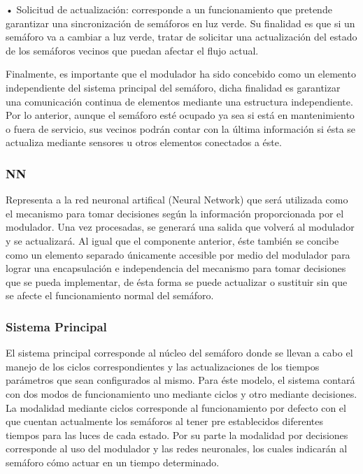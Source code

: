 •	Solicitud de actualizaci\'{o}n: corresponde a un funcionamiento que pretende garantizar una sincronizaci\'{o}n de sem\'{a}foros en luz verde. Su finalidad es que si un sem\'{a}foro va a cambiar a luz verde, tratar de solicitar una actualizaci\'{o}n del estado de los sem\'{a}foros vecinos que puedan afectar el flujo actual.

Finalmente, es importante que el modulador ha sido concebido como un elemento independiente del sistema principal del sem\'{a}foro, dicha finalidad es garantizar una comunicaci\'{o}n continua de elementos mediante una estructura independiente. Por lo anterior, aunque el sem\'{a}foro est\'{e} ocupado ya sea si est\'{a} en mantenimiento o fuera de servicio, sus vecinos podr\'{a}n contar con la \'{u}ltima informaci\'{o}n si \'{e}sta se actualiza mediante sensores u otros elementos conectados a \'{e}ste.


\subsubsection{NN}
Representa a la red neuronal artifical (Neural Network) que ser\'{a} utilizada como el mecanismo para tomar decisiones seg\'{u}n la informaci\'{o}n proporcionada por el modulador. Una vez procesadas, se generar\'{a} una salida que volver\'{a} al modulador y se actualizar\'{a}. Al igual que el componente anterior, \'{e}ste tambi\'{e}n se concibe como un elemento separado \'{u}nicamente accesible por medio del modulador para lograr una encapsulaci\'{o}n e independencia del mecanismo para tomar decisiones que se pueda implementar, de \'{e}sta forma se puede actualizar o sustituir sin que se afecte el funcionamiento normal del sem\'{a}foro.


\subsubsection{Sistema Principal}

El sistema principal corresponde al n\'{u}cleo del sem\'{a}foro donde se llevan a cabo el manejo de los ciclos correspondientes y las actualizaciones de los tiempos par\'{a}metros que sean configurados al mismo. Para \'{e}ste modelo, el sistema contar\'{a} con dos modos de funcionamiento uno mediante ciclos y otro mediante decisiones. La modalidad mediante ciclos corresponde al funcionamiento por defecto con el que cuentan actualmente los sem\'{a}foros al tener pre establecidos diferentes tiempos para las luces de cada estado. Por su parte la modalidad por decisiones corresponde al uso del modulador y las redes neuronales, los cuales indicar\'{a}n al sem\'{a}foro c\'{o}mo actuar en un tiempo determinado. 

